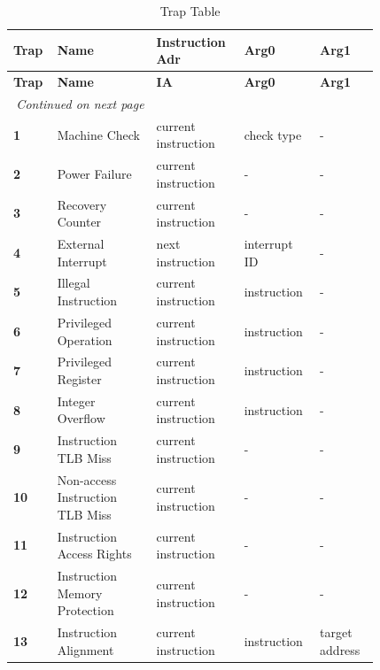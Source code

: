\begin{longtable}{@{}p{0.075\linewidth}p{0.25\linewidth}p{0.2\linewidth}p{0.15\linewidth}p{0.15\linewidth}@{}}
    \caption{Trap Table} \\
    \toprule
    \textbf{Trap} & \textbf{Name} & \textbf{Instruction Adr} & \textbf{Arg0} & \textbf{Arg1}\\
    \midrule
    \endfirsthead
    \toprule
    \textbf{Trap} & \textbf{Name} & \textbf{IA} & \textbf{Arg0} & \textbf{Arg1}\\
    \midrule
    \endhead
    \midrule
    \multicolumn{2}{r}{\textit{Continued on next page}} \\
    \midrule
    \endfoot
    \bottomrule
    \endlastfoot

    \textbf{1} & Machine Check & current instruction & check type & - \\
    \midrule
    \textbf{2} & Power Failure & current instruction & - & - \\
    \midrule
    \textbf{3} & Recovery Counter & current instruction & - & - \\
    \midrule
    \textbf{4} & External Interrupt & next instruction & interrupt ID & - \\
    \midrule

    \textbf{5} & Illegal Instruction & current instruction & instruction & - \\
    \midrule
    \textbf{6} & Privileged Operation & current instruction & instruction & - \\
    \midrule
    \textbf{7} & Privileged Register & current instruction & instruction & - \\
    \midrule
    \textbf{8} & Integer Overflow & current instruction & instruction & - \\
    \midrule

    \textbf{9} & Instruction TLB Miss & current instruction & - & - \\
    \midrule
    \textbf{10} & Non-access Instruction TLB Miss & current instruction & - & - \\
    \midrule
    \textbf{11} & Instruction Access Rights & current instruction & - & - \\
    \midrule
    \textbf{12} & Instruction Memory Protection & current instruction & - & - \\
    \midrule
    \textbf{13} & Instruction Alignment & current instruction & instruction & target address \\
    \midrule


\end{longtable}
